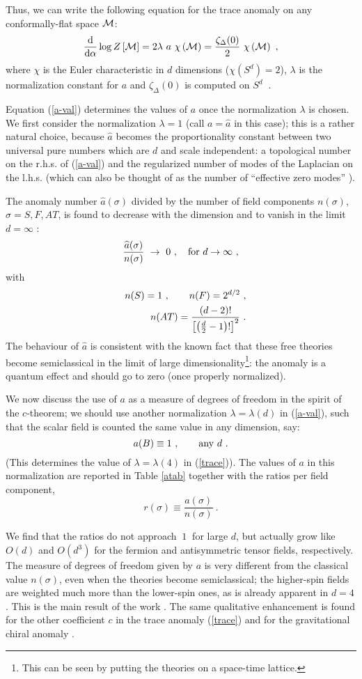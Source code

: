 \documentclass[proceedings]{JHEP}
\newcommand{\beq}{\begin{equation}}
\newcommand{\eeq}{\end{equation}}
\newcommand{\bea}{\begin{eqnarray}}
\newcommand{\eea}{\end{eqnarray}}
\def\s{\sigma}
\def\a{\alpha}
\def\l{\lambda}
\def\nl{\nonumber\\}
\begin{document}
Thus, we can write the following equation for
the trace anomaly on any conformally-flat space ${\cal M}$:
\beq
\frac{\rm d}{{\rm d}\a} \log Z\left[ {\cal M} \right] =
2\l\ a\ \chi\left({\cal M} \right) = 
\frac{\zeta_{\Delta}(0)}{2} \ \chi\left({\cal M} \right)\ ,
\label{a-val}\eeq
where $\chi$ is the Euler characteristic
in $d$ dimensions ($\chi\left(S^d\right)=2$),
$\l$ is the normalization constant for $a$ and 
$\zeta_\Delta(0)$ is computed on $S^d\ $ \cite{ad}.

Equation (\ref{a-val}) determines the values of $a$
once the normalization $\l$ is chosen.
We first consider the 
normalization $\l=1$ (call $a=\widehat{a}$ in this case);
this is a rather natural choice, because
 $\widehat{a}$ becomes the proportionality constant
between two universal pure numbers which are 
$d$ and scale independent: a topological number on the r.h.s. of (\ref{a-val})
and the regularized number of modes of the Laplacian on the l.h.s.
(which can also be thought of as the number of ``effective zero modes''
\cite{ad}).

The anomaly number $\widehat{a}(\s)$ 
divided by the number of field components $ n(\s)$,
 $\s=S,F,AT$, is found to decrease with the dimension 
and to vanish in the limit $d=\infty$ \cite{ad}:
\beq
\frac{\widehat{a}(\s)}{n(\s)}\ \to \ 0\ ,
\quad {\rm for} \ d\to\infty\ ,
\label{a-lim}\eeq
with
\bea
&& n(S)=1\ , \qquad n(F)=2^{d/2}\ , \nl
&& n(AT) = {(d-2)!\over \left[\left(\frac{d}{2}-1 \right)!\right]^2}\ .
\label{n-val}\eea
The behaviour of $\widehat{a}$ is consistent with the known fact
that these free theories 
become semiclassical in the limit of large dimensionality\footnote{
This can be seen by putting the theories on a space-time lattice.}:
the anomaly is a quantum effect and should go
to zero (once properly normalized).

We now discuss the use of $a$ as a measure
of degrees of freedom in the spirit of the
$c$-theorem; we should use another normalization $\l=\l(d)$
in (\ref{a-val}), such that the
scalar field is counted the same value in any dimension, say:
\beq
a(B)\equiv 1\ , \qquad {\rm any}\ d\ .
\label{a-def}\eeq
(This determines the value of $\l=\l(4)$ in (\ref{trace})).
The values of $a$ in this normalization are reported in Table \ref{atab}
together with the ratios per field component, 
\beq
r(\s)\equiv \frac{a(\s)}{n(\s)} \ .
\label{r-def}\eeq

We find that the ratios do not approach $\ 1\ $ for
large $d$, but actually grow like $O(d)$ and $O(d^3)$
for the fermion and antisymmetric tensor fields, respectively.
The measure of degrees of freedom 
given by $a$ is very different from the classical value
$n(\s)$, even when the theories become semiclassical; 
 the higher-spin fields are weighted much more
than the lower-spin ones, as is already apparent in $d=4$.
This is the main result of the work \cite{ad}.
The same qualitative enhancement is found \cite{ad} for the other coefficient
$c$ in the trace anomaly (\ref{trace}) and 
for the gravitational chiral anomaly \cite{lagw}.
\end{document}
